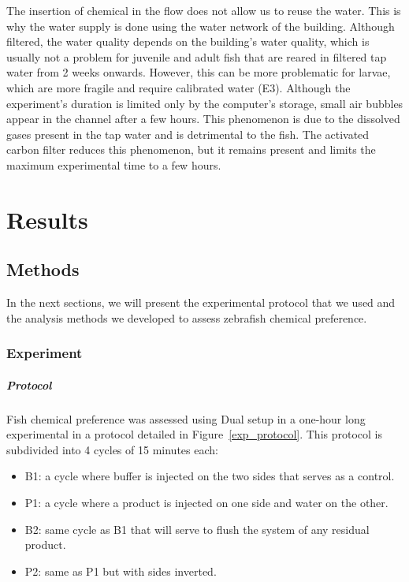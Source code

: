   The insertion of chemical in the flow does not allow us to reuse the water. This is why the water supply is done using the water network of the building. Although filtered, the water quality depends on the building's water quality, which is usually not a problem for juvenile and adult fish that are reared in filtered tap water from 2 weeks onwards. However, this can be more problematic for larvae, which are more fragile and require calibrated water (E3). Although the experiment's duration is limited only by the computer's storage, small air bubbles appear in the channel after a few hours. This phenomenon is due to the dissolved gases present in the tap water and is detrimental to the fish. The activated carbon filter reduces this phenomenon, but it remains present and limits the maximum experimental time to a few hours.

\chapter{Results}
  \section{Methods}
  In the next sections, we will present the experimental protocol that we used and the analysis methods we developed to assess zebrafish chemical preference.

  \subsection{Experiment}
  \paragraph{Protocol} Fish chemical preference was assessed using Dual setup in a one-hour long experimental in a protocol detailed in Figure~\ref{exp_protocol}. This protocol is subdivided into 4 cycles of 15 minutes each:
\begin{itemize}
  \item B1: a cycle where buffer is injected on the two sides that serves as a control.
  \item P1: a cycle where a product is injected on one side and water on the other.
  \item B2: same cycle as B1 that will serve to flush the system of any residual product.
  \item P2: same as P1 but with sides inverted.
\end{itemize}

